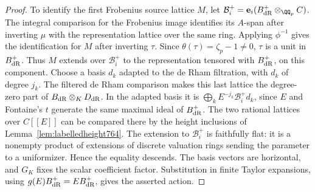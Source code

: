 \documentclass[a4paper,11pt]{article}
\theoremstyle{definition}
\theoremstyle{remark}
\numberwithin{equation}{section}
\begin{document}
\begin{proof}
To identify the first Frobenius source lattice \(M\), let
\(\mathcal B_i^+=\mathbf e_i(B_{\rm dR}^+\otimes_{\QQ_p}C)\).
The integral comparison for the Frobenius image identifies
its \(A\)-span after inverting \(\mu\) with the representation
lattice over the same ring. Applying \(\phi^{-1}\) gives
the identification for \(M\) after inverting \(\tau\).
Since \(\theta(\tau)=\zeta_p-1\ne0\), \(\tau\) is a unit
in \(B_{\rm dR}^+\). Thus \(M\) extends over \(\mathcal B_i^+\)
to the representation tensored with \(B_{\rm dR}^+\), on
this component. Choose a basis \(d_k\) adapted to the
de Rham filtration, with \(d_k\) of degree \(j_k\).
The filtered de Rham comparison makes this last lattice
the degree-zero part of \(B_{\rm dR}\otimes_K D_{\rm dR}\).
In the adapted basis it is
\(\bigoplus_k E^{-j_k}\mathcal B_i^+ d_k\), since \(E\)
and Fontaine's \(t\) generate the same maximal ideal of
\(B_{\rm dR}^+\). The two rational lattices over \(C[[E]]\)
can be compared there by the height inclusions of
Lemma~\ref{lem:labelledheight764}. The extension to
\(\mathcal B_i^+\) is faithfully flat: it is a nonempty
product of extensions of discrete valuation rings sending
the parameter to a uniformizer. Hence the equality descends.
The basis vectors are horizontal, and \(G_K\) fixes the
scalar coefficient factor. Substitution in finite Taylor
expansions, using \(g(E)B_{\rm dR}^+=E B_{\rm dR}^+\),
gives the asserted action.
\end{proof}
\end{document}
